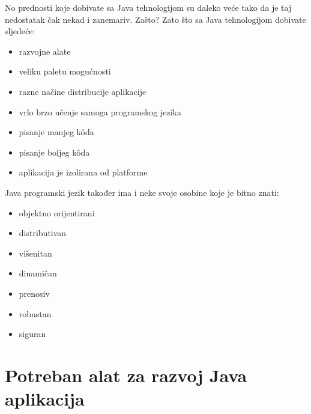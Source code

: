No prednosti koje dobivate sa Java tehnologijom su daleko veće tako da je taj nedostatak čak nekad i zanemariv. Zašto? Zato što sa Java tehnologijom dobivate sljedeće:

\begin{itemize}
    \item razvojne alate
    \item veliku paletu mogućnosti
    \item razne načine distribucije aplikacije
    \item vrlo brzo učenje samoga programskog jezika
    \item pisanje manjeg kôda
    \item pisanje boljeg kôda
    \item aplikacija je izolirana od platforme
\end{itemize}

Java programski jezik također ima i neke svoje osobine koje je bitno znati:

\begin{itemize}
    \item objektno orijentirani
    \item distributivan
    \item višenitan
    \item dinamičan
    \item prenosiv
    \item robustan
    \item siguran
\end{itemize}

\section{Potreban alat za razvoj Java aplikacija}